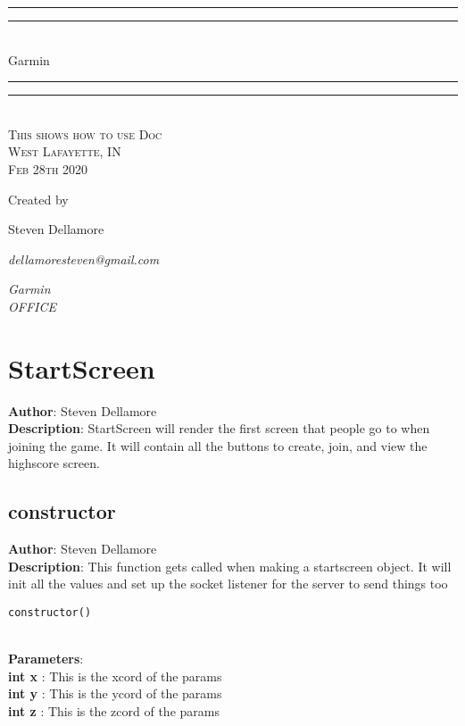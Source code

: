 \documentclass[12pt]{article}
\newlength{\drop}
\begin{document}
  \begin{titlepage}
    \centering
    \textheight
    \vspace*{7\baselineskip}
    \rule{\textwidth}{1.6pt}\vspace*{-\baselineskip}\vspace*{2pt}
    \rule{\textwidth}{0.4pt}\\[\baselineskip]
    {\LARGE Garmin}\\[0.2\baselineskip]
    \rule{\textwidth}{0.4pt}\vspace*{-\baselineskip}\vspace{3.2pt}
    \rule{\textwidth}{1.6pt}\\[\baselineskip]
    \scshape
    This shows how to use Doc \\
    West Lafayette, IN \\
    Feb 28th 2020\par
    \vspace*{2\baselineskip}
    Created by \\[\baselineskip]
    {\Large Steven Dellamore\par}
    {\itshape dellamoresteven@gmail.com\par}
    {\itshape Garmin \\ OFFICE\par}
  \end{titlepage}
  
\tableofcontents
\newpage


\section{StartScreen}
\textbf{Author}: Steven Dellamore \\
\textbf{Description}: StartScreen will render the first screen that people go to when joining the game. It will contain all the buttons to create, join, and view the highscore screen. \\



\subsection{constructor}
\textbf{Author}: Steven Dellamore \\
\textbf{Description}: This function gets called when making a startscreen object. It will init all the values and set up the socket listener for the server to send things too 

\begin{lstlisting}
constructor()
\end{lstlisting}\textbf{\large{\\Parameters}}:\\
\textbf{int x }: This is the xcord of the params\\
\textbf{int y }: This is the ycord of the params\\
\textbf{int z }: This is the zcord of the params\\
\end{document}
